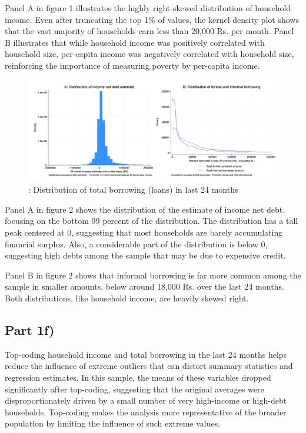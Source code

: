 \documentclass[12pt]{article}
\begin{document}
Panel A in figure 1 illustrates the highly right-skewed distribution of household income. Even after truncating the top 1\% of values, the kernel density plot shows that the vast majority of households earn less than 20,000 Rs. per month. Panel B illustrates that while household income was positively correlated with household size, per-capita income was negatively correlated with household size, reinforcing the importance of measuring poverty by per-capita income.


\begin{figure}[H]
    \centering
    \includegraphics[width=\textwidth]{figures/figure02_loandistribution.png}
    \caption{: Distribution of total borrowing (loans) in last 24 months}
\end{figure}

Panel A in figure 2 shows the distribution of the estimate of income net debt, focusing on the bottom 99 percent of the distribution. The distribution has a tall peak centered at 0, suggesting that most households are barely accumulating financial surplus. Also, a considerable part of the distribution is below 0, suggesting high debts among the sample that may be due to expensive credit. 

Panel B in figure 2 shows that informal borrowing is far more common among the sample in smaller amounts, below around 18,000 Rs. over the last 24 months. Both distributions, like household income, are heavily skewed right. 


\subsection*{Part 1f)}

Top-coding household income and total borrowing in the last 24 months helps reduce the influence of extreme outliers that can distort summary statistics and regression estimates. In this sample, the means of these variables dropped significantly after top-coding, suggesting that the original averages were disproportionately driven by a small number of very high-income or high-debt households. Top-coding makes the analysis more representative of the broader population by limiting the influence of such extreme values.
\end{document}
